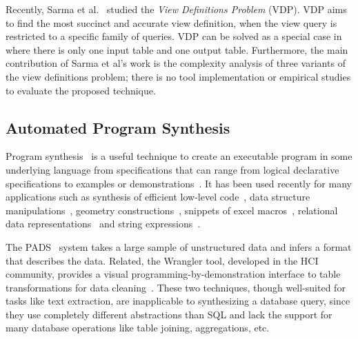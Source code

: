Recently, Sarma et al.~\cite{DasSarma:2010} studied the \textit{View Definitions Problem} (VDP).
VDP aims to find the most
succinct and accurate view definition, when
the view query is restricted to a specific family of queries.
VDP can be solved as a special case in \ourtool where there is only one
input table and one output table. Furthermore, the main contribution
of Sarma et al's work is the complexity analysis of
three variants of the view definitions problem; there is no
tool implementation or empirical studies to evaluate
the proposed technique.





\subsection{Automated Program Synthesis }


Program synthesis~\cite{Gulwani:2010:DPS} is a useful
technique to create an executable program
in some underlying language from specifications that can range
from logical declarative specifications to examples or
demonstrations~\cite{Harris:2011, singh:2012, Gulwani:2011,
Kandel:2011, Fisher08Pads,Lau:2003:PDU, Lau:2000:VSA, Barbosa:2010:MLA, Arasu:2009:LST}.
It has been used recently for many applications
such as synthesis of efficient low-level code~\cite{Solar-Lezama:2005},
data structure manipulations~\cite{Fisher:2008},
geometry constructions~\cite{Gulwani:2011:SGC},
snippets of excel macros~\cite{Harris:2011},
relational data representations~\cite{Barbosa:2010:MLA, Arasu:2009:LST} and string
expressions~\cite{singh:2012, Gulwani:2011}.


The PADS~\cite{Fisher:2008} system takes a large sample
of unstructured data and infers a
format that describes the data. Related,
the Wrangler tool, developed in the HCI community,
provides a visual programming-by-demonstration
interface to table transformations for data cleaning~\cite{Kandel:2011}.
These two techniques, though well-suited for tasks
like text extraction, are inapplicable to
synthesizing  a database query, since they use completely
different abstractions than SQL and lack the support
for many database operations like table joining, aggregations, etc.


